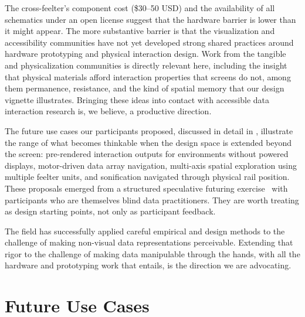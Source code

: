\documentclass[12pt]{cmuthesis}
\begin{document}
The cross-feelter's component cost (\$30--50 USD) and the availability of all schematics under an open license suggest that the hardware barrier is lower than it might appear. The more substantive barrier is that the visualization and accessibility communities have not yet developed strong shared practices around hardware prototyping and physical interaction design. Work from the tangible and physicalization communities is directly relevant here, including the insight that physical materials afford interaction properties that screens do not, among them permanence, resistance, and the kind of spatial memory that our design vignette illustrates. Bringing these ideas into contact with accessible data interaction research is, we believe, a productive direction.

The future use cases our participants proposed, discussed in detail in , illustrate the range of what becomes thinkable when the design space is extended beyond the screen: pre-rendered interaction outputs for environments without powered displays, motor-driven data array navigation, multi-axis spatial exploration using multiple feelter units, and sonification navigated through physical rail position. These proposals emerged from a structured speculative futuring exercise~\cite{Dunne2013} with participants who are themselves blind data practitioners. They are worth treating as design starting points, not only as participant feedback.

The field has successfully applied careful empirical and design methods to the challenge of making non-visual data representations perceivable. Extending that rigor to the challenge of making data manipulable through the hands, with all the hardware and prototyping work that entails, is the direction we are advocating.

\section{Future Use Cases}
\label{sec:futurework}
\end{document}

